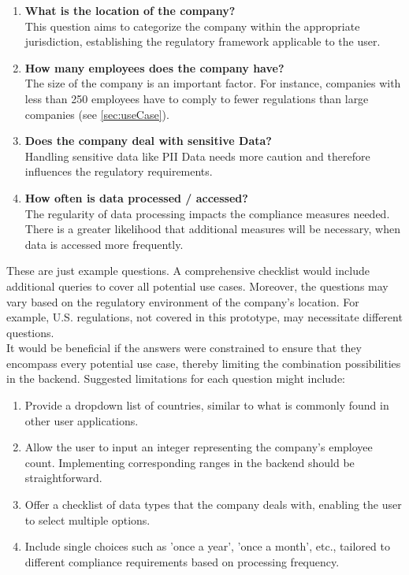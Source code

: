 \documentclass[
  a4paper,  %
  twoside,  %
  bibliography=totoc,
  headsepline,
  cleardoublepage=empty,
  parskip=half,
  draft=false
]{scrbook}
\begin{document}
\begin{enumerate}
    \item \textbf{What is the location of the company?} \\
    This question aims to categorize the company within the appropriate jurisdiction, establishing the regulatory framework applicable to the user. 
    \item \textbf{How many employees does the company have?}\\
    The size of the company is an important factor. For instance, companies with less than 250 employees have to comply to fewer regulations than large companies (see \ref{sec:useCase}).
    \item \textbf{Does the company deal with sensitive Data?}\\
    Handling sensitive data like \acrlong{PII} Data needs more caution and therefore influences the regulatory requirements.
    \item \textbf{How often is data processed / accessed?}\\
    The regularity of data processing impacts the compliance measures needed. There is a greater likelihood that additional measures will be necessary, when data is accessed more frequently.
\end{enumerate}

These are just example questions. A comprehensive checklist would include additional queries to cover all potential use cases. Moreover, the questions may vary based on the regulatory environment of the company's location. For example, U.S. regulations, not covered in this prototype, may necessitate different questions.\\
It would be beneficial if the answers were constrained to ensure that they encompass every potential use case, thereby limiting the combination possibilities in the backend. Suggested limitations for each question might include:
\begin{enumerate}
    \item  Provide a dropdown list of countries, similar to what is commonly found in other user applications.
    \item Allow the user to input an integer representing the company's employee count. Implementing corresponding ranges in the backend should be straightforward.
    \item Offer a checklist of data types that the company deals with, enabling the user to select multiple options.
    \item Include single choices such as 'once a year', 'once a month', etc., tailored to different compliance requirements based on processing frequency.
\end{enumerate}
\end{document}

